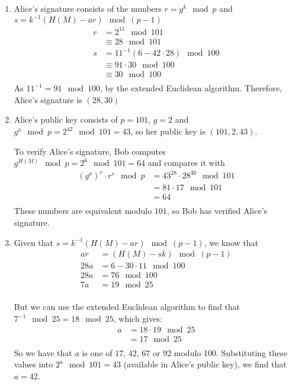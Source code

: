 \begin{enumerate}
\item Alice's signature consists of the numbers $r = g^k\mod p$ and
  $s = k^{-1}(H(M) - ar)\mod (p-1)$
  \begin{align*}
    r &= 2^{11} \mod 101 \\
      &\equiv 28 \mod 101 \\
    s &= 11^{-1}(6 - 42 \cdot 28)\mod 100 \\
      &\equiv 91 \cdot 30\mod 100 \\
      &\equiv 30 \mod 100\\
  \end{align*}
  As $11^{-1} = 91\mod 100$, by the extended Euclidean algorithm. Therefore, Alice's signature is $(28, 30)$

\item Alice's public key consists of $p = 101$, $g = 2$ and $g^a \mod p = 2^{42}
  \mod 101 = 43$, so her public key is $(101, 2, 43)$.

  To verify Alice's signature, Bob computes $g^{H(M)} \mod p = 2^6 \mod 101 = 64$
  and compares it with
  \begin{align*}
    (g^a)^r \cdot r^s \mod p &= 43^{28} \cdot 28^{30} \mod 101 \\
                             &= 81 \cdot 17 \mod 101 \\
                             &= 64 \\
  \end{align*}
  These numbers are equivalent modulo $101$, so Bob has verified Alice's signature.

\item Given that $s = k^{-1}(H(M) - ar)\mod (p-1)$, we know that
  \begin{align*}
    ar &= (H(M) - sk) \mod (p-1) \\
    28a &= 6 - 30 \cdot 11 \mod 100 \\
    28a &= 76 \mod 100 \\
    7a &= 19 \mod 25 \\
  \end{align*}

  But we can use the extended Euclidean algorithm to find that $7^{-1} \mod 25
  = 18 \mod 25$, which gives:
  \begin{align*}
    a &= 18 \cdot 19 \mod 25 \\
      &= 17 \mod 25 \\
  \end{align*}
  So we have that $a$ is one of $17$, $42$, $67$ or $92$ modulo 100. Substituting
  these values into $2^{a} \mod 101 = 43$ (available in Alice's public key), we
  find that $a = 42$.

\end{enumerate}
